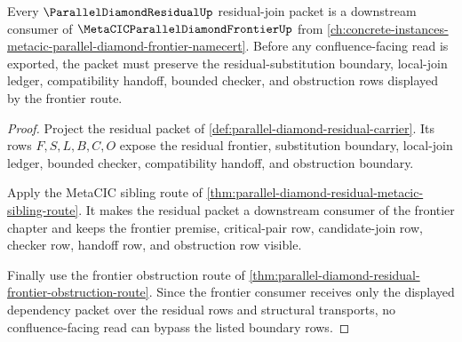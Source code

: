 \begin{theorem}
\label{thm:parallel-diamond-residual-metacic-route}
Every $\ParallelDiamondResidualUp$ residual-join packet is a downstream consumer of $\MetaCICParallelDiamondFrontierUp$ from \autoref{ch:concrete-instances-metacic-parallel-diamond-frontier-namecert}. Before any confluence-facing read is exported, the packet must preserve the residual-substitution boundary, local-join ledger, compatibility handoff, bounded checker, and obstruction rows displayed by the frontier route.
\end{theorem}
\begin{proof}
Project the residual packet of \autoref{def:parallel-diamond-residual-carrier}. Its rows $F,S,L,B,C,O$ expose the residual frontier, substitution boundary, local-join ledger, bounded checker, compatibility handoff, and obstruction boundary.

Apply the MetaCIC sibling route of \autoref{thm:parallel-diamond-residual-metacic-sibling-route}. It makes the residual packet a downstream consumer of the frontier chapter and keeps the frontier premise, critical-pair row, candidate-join row, checker row, handoff row, and obstruction row visible.

Finally use the frontier obstruction route of \autoref{thm:parallel-diamond-residual-frontier-obstruction-route}. Since the frontier consumer receives only the displayed dependency packet over the residual rows and structural transports, no confluence-facing read can bypass the listed boundary rows.
\end{proof}
